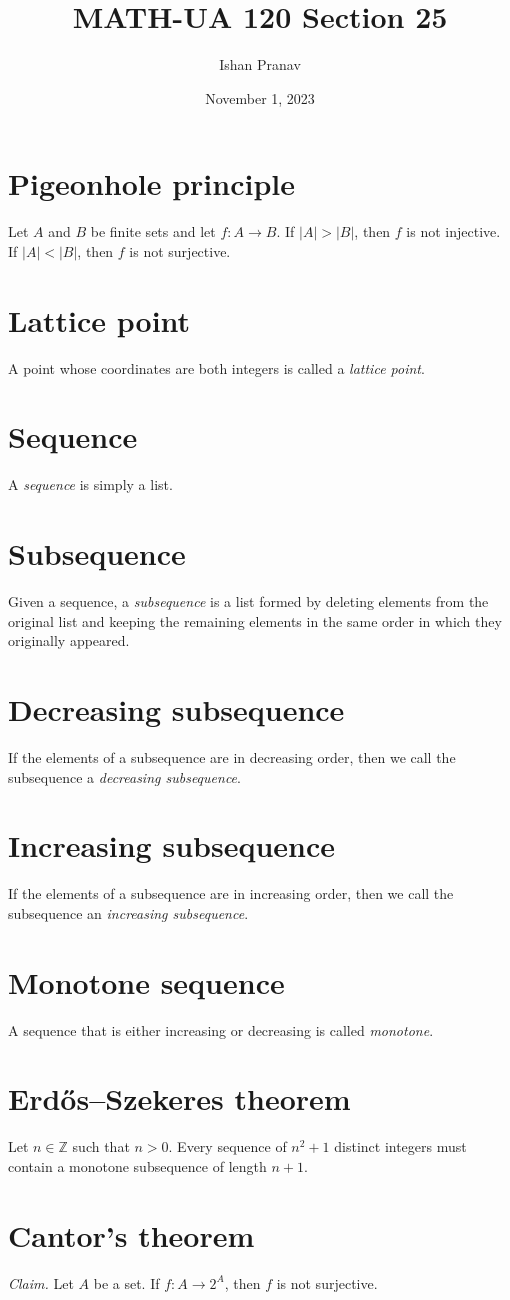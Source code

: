 \documentclass[12pt]{article}
\title{MATH-UA 120 Section 25}
\author{Ishan Pranav}
\date{November 1, 2023}
\begin{document}
\maketitle
\section*{Pigeonhole principle}
Let $A$ and $B$ be finite sets and let $f:A\to B$. If $|A|>|B|$, then $f$ is not injective. If $|A|<|B|$, then $f$ is not surjective.
\section*{Lattice point}
A point whose coordinates are both integers is called a \textit{lattice point}.
\section*{Sequence}
A \textit{sequence} is simply a list.
\section*{Subsequence}
Given a sequence, a \textit{subsequence} is a list formed by deleting elements from the original list and keeping the remaining elements in the same order in which they originally appeared.
\section*{Decreasing subsequence}
If the elements of a subsequence are in decreasing order, then we call the subsequence a \textit{decreasing subsequence}.
\section*{Increasing subsequence}
If the elements of a subsequence are in increasing order, then we call the subsequence an \textit{increasing subsequence}.
\section*{Monotone sequence}
A sequence that is either increasing or decreasing is called \textit{monotone}.
\section*{Erdős--Szekeres theorem}
Let $n\in\mathbb{Z}$ such that $n>0$. Every sequence of $n^2+1$ distinct integers must contain a monotone subsequence of length $n+1$.
\section*{Cantor's theorem}
\noindent\textit{Claim. }Let $A$ be a set. If $f:A\to 2^A$, then $f$ is not surjective.\newline 
\end{document}
